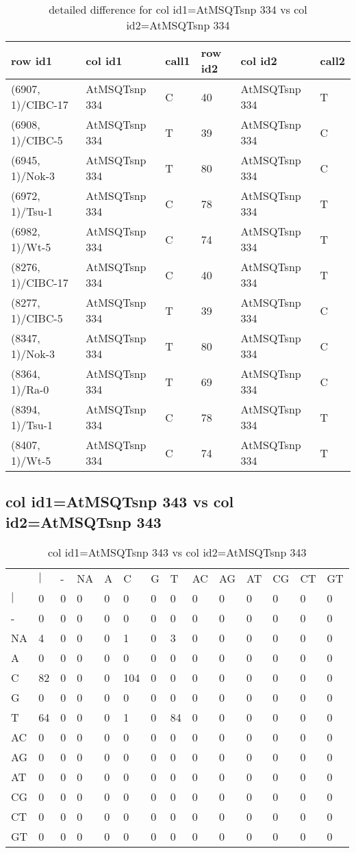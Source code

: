 \begin{center}
\begin{longtable}{|l|l|l|l|l|l|}
\caption{detailed difference for col id1=AtMSQTsnp 334 vs col id2=AtMSQTsnp 334} \label{table_dm869}\\
\hline
row id1&col id1&call1&row id2&col id2&call2\\
\hline
(6907, 1)/CIBC-17&AtMSQTsnp 334&C&40&AtMSQTsnp 334&T\\
(6908, 1)/CIBC-5&AtMSQTsnp 334&T&39&AtMSQTsnp 334&C\\
(6945, 1)/Nok-3&AtMSQTsnp 334&T&80&AtMSQTsnp 334&C\\
(6972, 1)/Tsu-1&AtMSQTsnp 334&C&78&AtMSQTsnp 334&T\\
(6982, 1)/Wt-5&AtMSQTsnp 334&C&74&AtMSQTsnp 334&T\\
(8276, 1)/CIBC-17&AtMSQTsnp 334&C&40&AtMSQTsnp 334&T\\
(8277, 1)/CIBC-5&AtMSQTsnp 334&T&39&AtMSQTsnp 334&C\\
(8347, 1)/Nok-3&AtMSQTsnp 334&T&80&AtMSQTsnp 334&C\\
(8364, 1)/Ra-0&AtMSQTsnp 334&T&69&AtMSQTsnp 334&C\\
(8394, 1)/Tsu-1&AtMSQTsnp 334&C&78&AtMSQTsnp 334&T\\
(8407, 1)/Wt-5&AtMSQTsnp 334&C&74&AtMSQTsnp 334&T\\
\hline
\end{longtable}
\end{center}

\subsection{col id1=AtMSQTsnp 343 vs col id2=AtMSQTsnp 343}
\begin{center}
\begin{longtable}{|l|l|l|l|l|l|l|l|l|l|l|l|l|l|}
\caption{col id1=AtMSQTsnp 343 vs col id2=AtMSQTsnp 343} \label{table_dm870}\\
\hline
\\
\hline
&$|$&-&NA&A&C&G&T&AC&AG&AT&CG&CT&GT\\
$|$&0&0&0&0&0&0&0&0&0&0&0&0&0\\
-&0&0&0&0&0&0&0&0&0&0&0&0&0\\
NA&4&0&0&0&1&0&3&0&0&0&0&0&0\\
A&0&0&0&0&0&0&0&0&0&0&0&0&0\\
C&82&0&0&0&104&0&0&0&0&0&0&0&0\\
G&0&0&0&0&0&0&0&0&0&0&0&0&0\\
T&64&0&0&0&1&0&84&0&0&0&0&0&0\\
AC&0&0&0&0&0&0&0&0&0&0&0&0&0\\
AG&0&0&0&0&0&0&0&0&0&0&0&0&0\\
AT&0&0&0&0&0&0&0&0&0&0&0&0&0\\
CG&0&0&0&0&0&0&0&0&0&0&0&0&0\\
CT&0&0&0&0&0&0&0&0&0&0&0&0&0\\
GT&0&0&0&0&0&0&0&0&0&0&0&0&0\\
\hline
\end{longtable}
\end{center}

